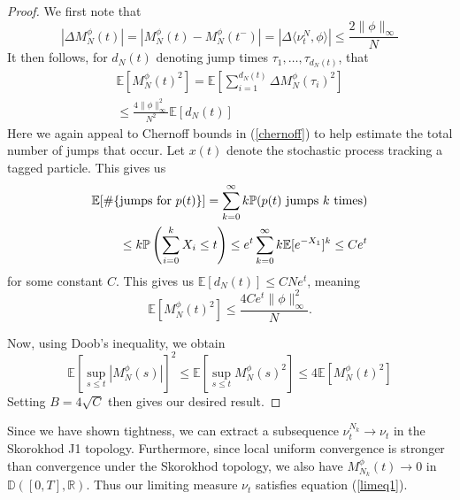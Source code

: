 \begin{proof} 
We first note that
\begin{equation}
|\Delta M_N^\phi(t) |= |M_N^\phi(t)-M_N^\phi(t^-)| = |\Delta\langle \nu_t^N,\phi\rangle| \le \frac{2\|\phi\|_\infty}N 
\end{equation}
It then follows, for $d_N(t)$ denoting jump times $\tau_1, \dots, \tau_{d_N(t)}$, that
\begin{eqnarray}
\mathbb E\left[M_N^\phi(t)^2\right] = \mathbb{E}\left[\sum_{i = 1}^{d_N(t)}\Delta M_N^\phi(\tau_i)^2\right]\\
\le\frac{4\|\phi\|_\infty^2}{N^2} \mathbb{E}[d_N(t)]\nonumber
\end{eqnarray}
Here we again appeal to Chernoff bounds in (\ref{chernoff}) to help estimate the total number of jumps that occur. Let $x(t)$ denote the stochastic process tracking a tagged  particle.  This gives us 
 \begin{eqnarray}
 \mathbb{E}[\#\{\hbox{jumps for } p(t)\}] = \sum_{k = 0}^\infty k \mathbb{P}(p(t) \hbox{ jumps $k$ times})\\
\le k\mathbb{P}\left(\sum_{i = 0}^k X_i \le t\right)\le e^t \sum_{k = 0}^\infty k\mathbb{E}[e^{-X_1}]^k\le Ce^t \nonumber 
\end{eqnarray} 
for some constant $C$.  This gives us $\mathbb E[d_N(t)] \le CNe^t$, meaning
\begin{equation}
\mathbb{E}[M_N^\phi(t)^2] \le  \frac{4Ce^t\|\phi\|_\infty^2}{N}.
\end{equation}

Now, using Doob's inequality, we obtain
\begin{equation}
\mathbb{E}\left[\sup_{s \le t}|M_N^\phi(s)|\right]^2 \le \mathbb E\left[\sup_{s \le t} M_N^\phi(s)^2\right] \le 4\mathbb E[M_N^\phi(t)^2]
\end{equation}
Setting $B =4 \sqrt C$ then gives our desired result.
\end{proof}

Since we have shown tightness, we can extract a subsequence $\nu_t^{N_k} \rightarrow \nu_t$ in the Skorokhod J1 topology.  Furthermore, since local uniform  convergence is stronger than convergence under the Skorokhod topology, we also have $M_{N_k}^\phi(t) \rightarrow 0$ in $\mathbb D([0,T], \mathbb{R})$.  Thus our limiting measure $\nu_t$ satisfies equation (\ref{limeq1}).

